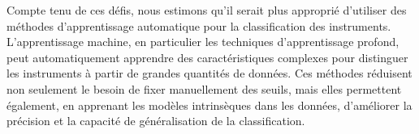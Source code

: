 Compte tenu de ces défis, nous estimons qu'il serait plus approprié d'utiliser des méthodes d'apprentissage automatique pour la classification des instruments. L'apprentissage machine, en particulier les techniques d'apprentissage profond, peut automatiquement apprendre des caractéristiques complexes pour distinguer les instruments à partir de grandes quantités de données. Ces méthodes réduisent non seulement le besoin de fixer manuellement des seuils, mais elles permettent également, en apprenant les modèles intrinsèques dans les données, d'améliorer la précision et la capacité de généralisation de la classification.